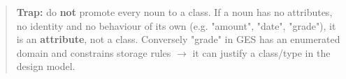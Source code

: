 \begin{studycolumns}
\begin{quote}\small\color{navy}
\textbf{Trap:} do \textbf{not} promote every noun to a class. If a noun has no attributes, no identity and no behaviour of its own (e.g. "amount", "date", "grade"), it is an \textbf{attribute}, not a class. Conversely "grade" in GES has an enumerated domain and constrains storage rules \ensuremath{\rightarrow} it can justify a class/\allowbreak{}type in the design model.

\end{quote}
\end{studycolumns}
